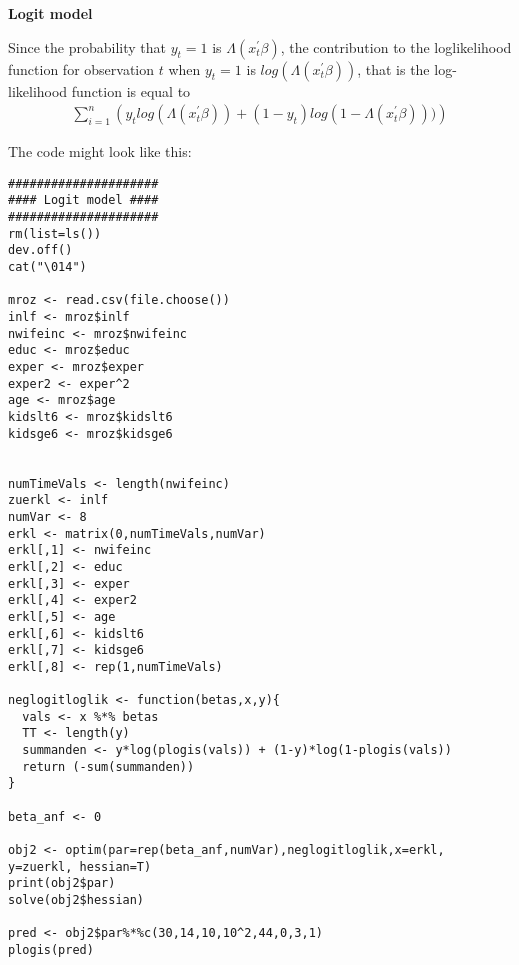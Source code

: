 \documentclass{article}
\begin{document}
\begin{solution}
\textbf{Logit model}

Since the probability that $y_t=1$ is $\Lambda \left( x_{t}^{\prime }\beta \right)$, the contribution to the loglikelihood function for observation $t$ when $y_t=1$ is $log(\Lambda \left( x_{t}^{\prime }\beta \right))$, that is the log-likelihood function is equal to
\begin{align*}
\sum_{i=1}^{n} \left(y_t log(\Lambda \left( x_{t}^{\prime }\beta \right)) + (1-y_t)log(1-\Lambda \left( x_{t}^{\prime }\beta \right)))\right)
\end{align*}

The code might look like this:
\begin{verbatim}
#####################
#### Logit model ####
#####################
rm(list=ls())
dev.off()
cat("\014")

mroz <- read.csv(file.choose())
inlf <- mroz$inlf
nwifeinc <- mroz$nwifeinc
educ <- mroz$educ
exper <- mroz$exper
exper2 <- exper^2
age <- mroz$age
kidslt6 <- mroz$kidslt6
kidsge6 <- mroz$kidsge6


numTimeVals <- length(nwifeinc)
zuerkl <- inlf
numVar <- 8
erkl <- matrix(0,numTimeVals,numVar)
erkl[,1] <- nwifeinc
erkl[,2] <- educ
erkl[,3] <- exper
erkl[,4] <- exper2
erkl[,5] <- age
erkl[,6] <- kidslt6
erkl[,7] <- kidsge6
erkl[,8] <- rep(1,numTimeVals)

neglogitloglik <- function(betas,x,y){
  vals <- x %*% betas
  TT <- length(y)
  summanden <- y*log(plogis(vals)) + (1-y)*log(1-plogis(vals))
  return (-sum(summanden))
}

beta_anf <- 0

obj2 <- optim(par=rep(beta_anf,numVar),neglogitloglik,x=erkl, y=zuerkl, hessian=T)
print(obj2$par)
solve(obj2$hessian)

pred <- obj2$par%*%c(30,14,10,10^2,44,0,3,1)
plogis(pred)


\end{verbatim}
\end{solution}
\end{document}
